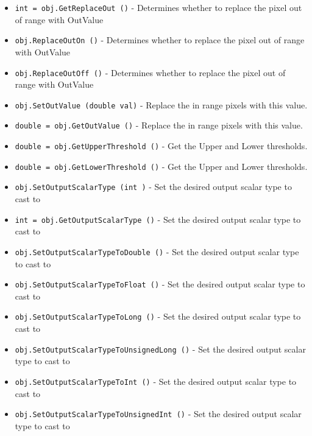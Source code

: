 \begin{itemize}
\item  \verb|int = obj.GetReplaceOut ()| -  Determines whether to replace the pixel out of range with OutValue

\item  \verb|obj.ReplaceOutOn ()| -  Determines whether to replace the pixel out of range with OutValue

\item  \verb|obj.ReplaceOutOff ()| -  Determines whether to replace the pixel out of range with OutValue

\item  \verb|obj.SetOutValue (double val)| -  Replace the in range pixels with this value.

\item  \verb|double = obj.GetOutValue ()| -  Replace the in range pixels with this value.

\item  \verb|double = obj.GetUpperThreshold ()| -  Get the Upper and Lower thresholds.

\item  \verb|double = obj.GetLowerThreshold ()| -  Get the Upper and Lower thresholds.

\item  \verb|obj.SetOutputScalarType (int )| -  Set the desired output scalar type to cast to

\item  \verb|int = obj.GetOutputScalarType ()| -  Set the desired output scalar type to cast to

\item  \verb|obj.SetOutputScalarTypeToDouble ()| -  Set the desired output scalar type to cast to

\item  \verb|obj.SetOutputScalarTypeToFloat ()| -  Set the desired output scalar type to cast to

\item  \verb|obj.SetOutputScalarTypeToLong ()| -  Set the desired output scalar type to cast to

\item  \verb|obj.SetOutputScalarTypeToUnsignedLong ()| -  Set the desired output scalar type to cast to

\item  \verb|obj.SetOutputScalarTypeToInt ()| -  Set the desired output scalar type to cast to

\item  \verb|obj.SetOutputScalarTypeToUnsignedInt ()| -  Set the desired output scalar type to cast to


\end{itemize}
